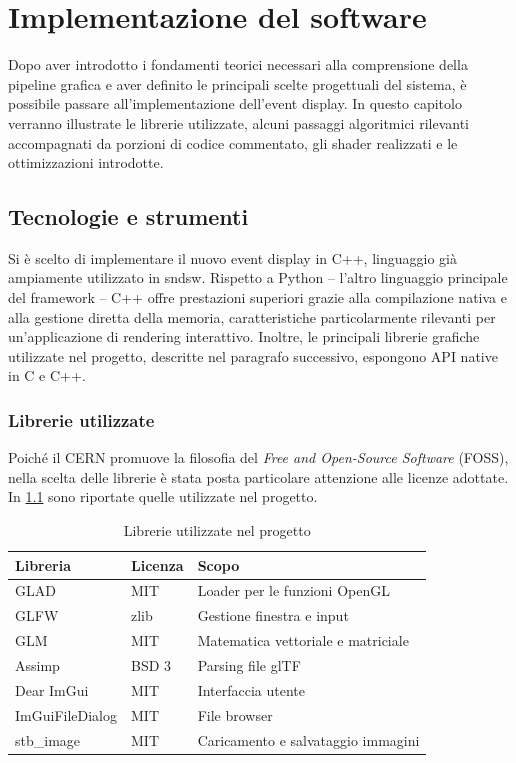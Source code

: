 \chapter{Implementazione del software}
Dopo aver introdotto i fondamenti teorici necessari alla comprensione della pipeline grafica e aver definito le principali scelte progettuali del sistema, è possibile passare all'implementazione dell'event display.
In questo capitolo verranno illustrate le librerie utilizzate, alcuni passaggi algoritmici rilevanti accompagnati da porzioni di codice commentato, gli shader realizzati e le ottimizzazioni introdotte.

%
%
\section{Tecnologie e strumenti}
Si è scelto di implementare il nuovo event display in C++, linguaggio già ampiamente utilizzato in sndsw.
Rispetto a Python -- l'altro linguaggio principale del framework -- C++ offre prestazioni superiori grazie alla compilazione nativa e alla gestione diretta della memoria, caratteristiche particolarmente rilevanti per un'applicazione di rendering interattivo.
Inoltre, le principali librerie grafiche utilizzate nel progetto, descritte nel paragrafo successivo, espongono API native in C e C++.

\subsection{Librerie utilizzate}
Poiché il CERN promuove la filosofia del \emph{Free and Open-Source Software} (FOSS), nella scelta delle librerie è stata posta particolare attenzione alle licenze adottate.
In \cref{tab:librerie} sono riportate quelle utilizzate nel progetto.

\begin{table}[ht]
    \centering
    \begin{tabular}{lll}
        \toprule
        \textbf{Libreria} & \textbf{Licenza} & \textbf{Scopo} \\
        \midrule
        GLAD    & MIT   & Loader per le funzioni OpenGL \\
        GLFW    & zlib  & Gestione finestra e input \\
        GLM     & MIT   & Matematica vettoriale e matriciale \\
        Assimp  & BSD 3 & Parsing file glTF \\
        Dear ImGui      & MIT  & Interfaccia utente \\
        ImGuiFileDialog & MIT  & File browser \\
        stb\_image      & MIT  & Caricamento e salvataggio immagini \\
        \bottomrule
    \end{tabular}
    \caption{Librerie utilizzate nel progetto}
    \label{tab:librerie}
\end{table}

